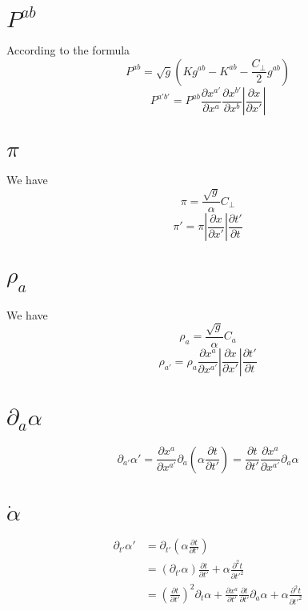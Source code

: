 \documentclass{article}
\begin{document}
\section{$P^{ab}$}
According to the formula
\[
P^{ab} = \sqrt{g}(Kg^{ab} - K^{ab} - \frac{C_{\perp}}{2}g^{ab})
\]
{\color{red}
\[
\boxed{
P^{a'b'} = P^{ab}\frac{\partial x^{a'}}{\partial x^{a}}\frac{\partial x^{b'}}{\partial x^{b}}|\frac{\partial x}{\partial x'}|
}
\]
}
\section{$\pi$}
We have
\[
\pi = \frac{\sqrt{g}}{\alpha}C_{\perp}
\]
{\color{red}
\[
\boxed{
\pi' = \pi|\frac{\partial x}{\partial x'}|\frac{\partial t'}{\partial t}
}
\]
}
\section{$\rho_{a}$}
We have
\[
\rho_{a} = \frac{\sqrt{g}}{\alpha}C_{a}
\]
{\color{red}
\[
\boxed{
\rho_{a'} = \rho_{a}\frac{\partial x^{a}}{\partial x^{a'}}|\frac{\partial x}{\partial x'}|\frac{\partial t'}{\partial t}
}
\]
}
\section{$\partial_{a}\alpha$}
\[
\partial_{a'}\alpha' = \frac{\partial x^{a}}{\partial x^{a'}}\partial_{a}(\alpha\frac{\partial t}{\partial t'}) = \frac{\partial t}{\partial t'}\frac{\partial x^{a}}{\partial x^{a'}}\partial_{a}\alpha
\]
\section{${\dot \alpha}$}
\begin{align*}
\partial_{t'}\alpha' & = \partial_{t'}(\alpha\frac{\partial t}{\partial t'}) \\
& = (\partial_{t'}\alpha)\frac{\partial t}{\partial t'} + \alpha\frac{\partial^{2} t}{\partial t'^2}\\
& = (\frac{\partial t}{\partial t'})^{2}\partial_{t}\alpha + \frac{\partial x^{a}}{\partial t'}\frac{\partial t}{\partial t'}\partial_{a}\alpha + \alpha\frac{\partial^{2} t}{\partial t'^2}
\end{align*}
\end{document}
